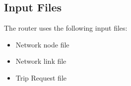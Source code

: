 \documentclass[English]{article}
\theoremstyle{remark}
\numberwithin{equation}{section}
\begin{document}


\subsection{Input Files}
\label{sec:inputfiles}

The router uses the following input files:
\begin{itemize}
\item Network node file
\item Network link file
\item Trip Request file
\end{itemize}
\end{document}
